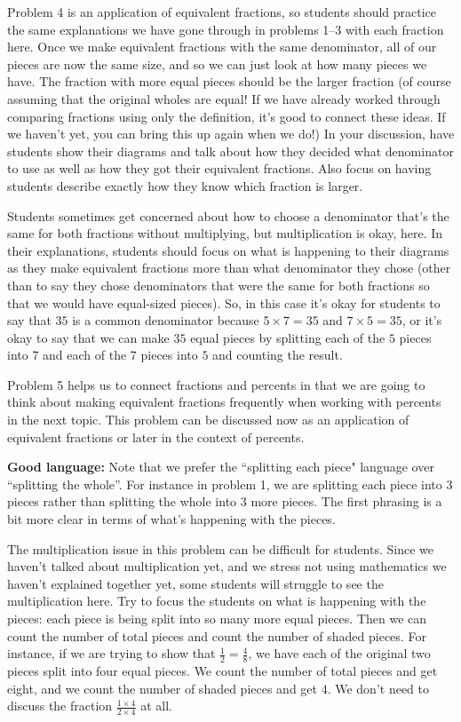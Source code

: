 \documentclass[nooutcomes,noauthor,handout]{ximera}
\begin{document}
\begin{instructorNotes}
Problem 4 is an application of equivalent fractions, so students should practice the same explanations we have gone through in problems 1--3 with each fraction here. Once we make equivalent fractions with the same denominator, all of our pieces are now the same size, and so we can just look at how many pieces we have. The fraction with more equal pieces should be the larger fraction (of course assuming that the original wholes are equal! If we have already worked through comparing fractions using only the definition, it's good to connect these ideas. If we haven't yet, you can bring this up again when we do!) In your discussion, have students show their diagrams and talk about how they decided what denominator to use as well as how they got their equivalent fractions. Also focus on having students describe exactly how they know which fraction is larger. 

Students sometimes get concerned about how to choose a denominator that's the same for both fractions without multiplying, but multiplication is okay, here. In their explanations, students should focus on what is happening to their diagrams as they make equivalent fractions more than what denominator they chose (other than to say they chose denominators that were the same for both fractions so that we would have equal-sized pieces). So, in this case it's okay for students to say that $35$ is a common denominator because $5\times 7 = 35$ and $7 \times 5 = 35$, or it's okay to say that we can make $35$ equal pieces by splitting each of the $5$ pieces into $7$ and each of the $7$ pieces into $5$ and counting the result.

Problem 5 helps us to connect fractions and percents in that we are going to think about making equivalent fractions frequently when working with percents in the next topic. This problem can be discussed now as an application of equivalent fractions or later in the context of percents.


{\bf Good language:} Note that we prefer the ``splitting each piece" language over ``splitting the whole''. For instance in problem 1, we are splitting each piece into 3 pieces rather than splitting the whole into $3$ more pieces. The first phrasing is a bit more clear in terms of what's happening with the pieces.

The multiplication issue in this problem can be difficult for students. Since we haven't talked about multiplication yet, and we stress not using mathematics we haven't explained together yet, some students will struggle to see the multiplication here. Try to focus the students on what is happening with the pieces: each piece is being split into so many more equal pieces. Then we can count the number of total pieces and count the number of shaded pieces. For instance, if we are trying to show that $\frac{1}{2} = \frac{4}{8}$, we have each of the original two pieces split into four equal pieces. We count the number of total pieces and get eight, and we count the number of shaded pieces and get $4$. We don't need to discuss the fraction $\frac{1\times 4}{2 \times 4}$ at all.


\end{instructorNotes}
\end{document}
